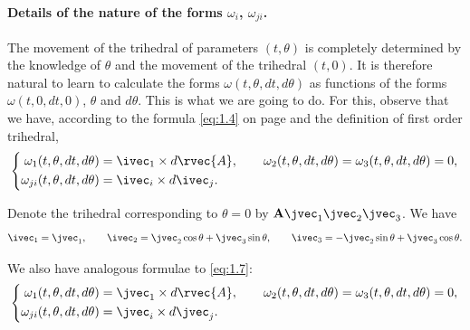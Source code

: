 \paragraph{Details of the nature of the forms $\omega_i$, $\omega_{ji}$.}
\label{sec:18}
The movement of the trihedral of parameters $(t,\theta)$ is completely determined by the knowledge of $\theta$ and the movement of the trihedral $(t,0)$. It is therefore natural to learn to calculate the forms $\omega(t,\theta,dt,d\theta)$ as functions of the forms $\omega(t,0,dt,0)$, $\theta$ and $d\theta$. This is what we are going to do. For this, observe that we have, according to the formula \eqref{eq:1.4} on page \pageref{eq:1.4} and the definition of first order trihedral,
\begin{equation}
  \label{eq:1.7}
  \left\{
    \begin{aligned}
      \omega_{1}(t,\theta,dt,d\theta)&=\ivec_{1}\times d{\rvec{A}},\qquad\omega_{2}(t,\theta,dt,d\theta)=\omega_{3}(t,\theta,dt,d\theta)=0,\\
      \omega_{ji}(t,\theta,dt,d\theta)&=\ivec_{i}\times d\ivec_{j}.
    \end{aligned}
  \right.
\end{equation}

Denote the trihedral corresponding to $\theta=0$ by $\mathbf{A}{\jvec}_{1}{\jvec}_{2}{\jvec}_{3}$. We have
\begin{equation}
  \label{eq:1.8}
  \ivec_{1}={\jvec}_{1},\qquad\ivec_{2}={\jvec}_{2}\cos\theta+{\jvec}_{3}\sin\theta,\qquad\ivec_{3}=-{\jvec}_{2}\sin\theta+{\jvec}_{3}\cos\theta.
\end{equation}

We also have analogous formulae to \eqref{eq:1.7}:
\begin{equation}
  \label{eq:1.9}
  \left\{
    \begin{aligned}
      \omega_{1}(t,\theta,dt,d\theta)&={\jvec}_{1}\times d{\rvec{A}},\qquad\omega_{2}(t,\theta,dt,d\theta)=\omega_{3}(t,\theta,dt,d\theta)=0,\\
      \omega_{ji}(t,\theta,dt,d\theta)&={\jvec}_{i}\times d{\jvec}_{j}.
    \end{aligned}
  \right.  
\end{equation}

